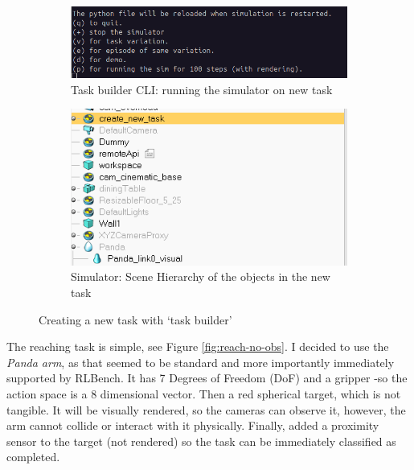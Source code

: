 \begin{figure}[htbp]
  \begin{subfigure}{0.48\linewidth}
    \centering
    \includegraphics[width=0.8\linewidth]{assets/early-work/task-builder-cli-2.png}
    \caption{Task builder CLI: running the simulator on new task}
  \end{subfigure}
  \hfill
  \begin{subfigure}{0.48\textwidth}
    \centering
    \includegraphics[width=0.8\linewidth]{assets/early-work/task-builder-scene-hierarchy.png}
    \caption{Simulator: Scene Hierarchy of the objects in the new task}
  \end{subfigure}
  \caption{Creating a new task with `task builder'}\label{fig:task-builder}
\end{figure}


The reaching task is simple, see Figure \ref{fig:reach-no-obs}. I decided to use the \emph{Panda arm}, as that seemed to be standard and more importantly immediately supported by RLBench. It has 7 Degrees of Freedom (DoF) and a gripper -so the action space is a 8 dimensional vector. Then a red spherical target, which is not tangible. It will be visually rendered, so the cameras can observe it, however, the arm cannot collide or interact with it physically. Finally, added a proximity sensor to the target (not rendered) so the task can be immediately classified as completed.

